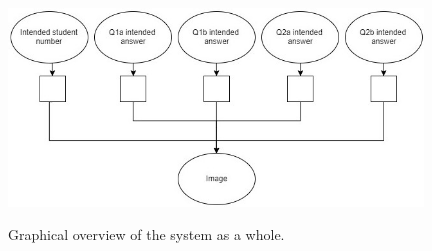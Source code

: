 \begin{figure}[b]
  \centering
  \includegraphics[width=11cm]{systemOverview}\\
  \caption{Graphical overview of the system as a whole.}
  \label{fig:systemOverviewIntro}
\end{figure}




